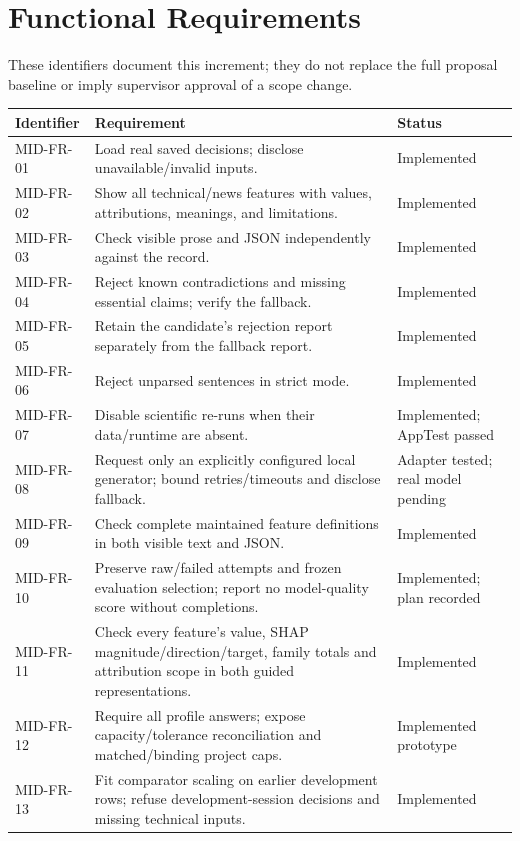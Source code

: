 \section{Functional Requirements}
These identifiers document this increment; they do not replace the full proposal baseline or imply supervisor approval of a scope change.
\begin{longtable}{p{}p{}p{}}
\toprule Identifier & Requirement & Status\\\midrule
MID-FR-01 & Load real saved decisions; disclose unavailable/invalid inputs. & Implemented\\
MID-FR-02 & Show all technical/news features with values, attributions, meanings, and limitations. & Implemented\\
MID-FR-03 & Check visible prose and JSON independently against the record. & Implemented\\
MID-FR-04 & Reject known contradictions and missing essential claims; verify the fallback. & Implemented\\
MID-FR-05 & Retain the candidate's rejection report separately from the fallback report. & Implemented\\
MID-FR-06 & Reject unparsed sentences in strict mode. & Implemented\\
MID-FR-07 & Disable scientific re-runs when their data/runtime are absent. & Implemented; AppTest passed\\
MID-FR-08 & Request only an explicitly configured local generator; bound retries/timeouts and disclose fallback. & Adapter tested; real model pending\\
MID-FR-09 & Check complete maintained feature definitions in both visible text and JSON. & Implemented\\
MID-FR-10 & Preserve raw/failed attempts and frozen evaluation selection; report no model-quality score without completions. & Implemented; plan recorded\\
MID-FR-11 & Check every feature's value, SHAP magnitude/direction/target, family totals and attribution scope in both guided representations. & Implemented\\
MID-FR-12 & Require all profile answers; expose capacity/tolerance reconciliation and matched/binding project caps. & Implemented prototype\\
MID-FR-13 & Fit comparator scaling on earlier development rows; refuse development-session decisions and missing technical inputs. & Implemented\\

\end{longtable}
